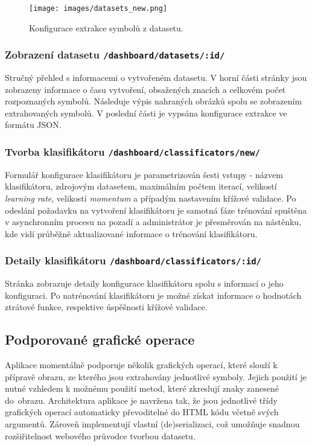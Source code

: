 \documentclass[
  field=ainfp,
  master=true,
  biblatex,
  sourcecodes=false,
  theorems=false,
  glossaries,
  index
]{kidiplom}
\begin{document}
\begin{figure}[h]
  \centering
  \texttt{[image: images/datasets\_new.png]}
  \caption{Konfigurace extrakce symbolů z datasetu.}
  \label{fig:dataset_new}
\end{figure}

\subsubsection*{Zobrazení datasetu \texttt{/dashboard/datasets/:id/}}
Stručný přehled s informacemi o vytvořeném datasetu. V horní části stránky jsou zobrazeny informace o času vytvoření, obsažených znacích a celkovém počet rozpoznaných symbolů. Následuje výpis nahraných obrázků spolu se zobrazením extrahovaných symbolů. V poslední části je vypsána konfigurace extrakce ve formátu JSON. 

\subsubsection*{Tvorba klasifikátoru \texttt{/dashboard/classificators/new/}}
Formulář konfigurace klasifikátoru je parametrizován šesti vstupy - názvem klasifikátoru, zdrojovým datasetem, maximálním počtem iterací, velikostí \textit{learning rate}, velikostí \textit{momentum} a případým nastavením křížové validace. Po odeslání požadavku na vytvoření klasifikátoru je samotná fáze trénování spuštěna v asynchronním procesu na pozadí a administrátor je přesměrován na nástěnku, kde vidí průběžně aktualizované informace o trénování klasifikátoru.

\subsubsection*{Detaily klasifikátoru \texttt{/dashboard/classificators/:id/}}
Stránka zobrazuje detaily konfigurace klasifikátoru spolu s informací o jeho konfiguraci. Po natrénování klasifikátoru je možné získat informace o hodnotách ztrátové funkce, respektive úspěšnosti křížové validace.

\subsection{Podporované grafické operace}
Aplikace momentálně podporuje několik grafických operací, které slouží k pří\-pravě obrazu, ze kterého jsou extrahovány jednotlivé symboly. Jejich použití je nutné vzhledem k možnému použití metod, které zkreslují znaky zanesené do~obrazu. Architektura aplikace je navržena tak, že jsou jednotlivé třídy grafických operací automaticky převoditelné do HTML kódu včetně svých argumentů. Zároveň implementují vlastní (de)se\-riali\-zaci, což umožňuje snadnou rozšiřitelnost webového průvodce tvorbou data\-setu.
\end{document}
